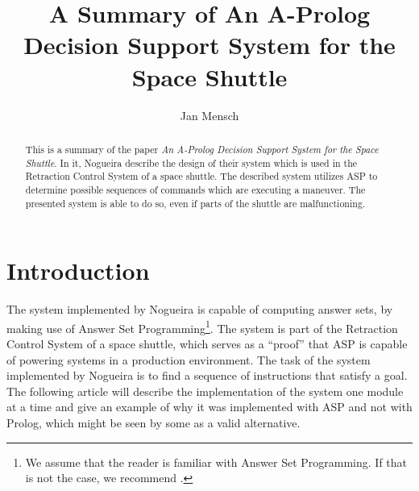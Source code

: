 \documentclass[runningheads]{llncs}
\newcommand{\papertitle}{An A-Prolog Decision Support System for the Space Shuttle}
\newcommand{\authorquote}{Nogueira \etal}
\begin{document}
\title{A Summary of \papertitle}

\author{Jan Mensch}




%
\maketitle              %
%
\begin{abstract}
This is a summary of the paper \textit{\papertitle}\cite{nogueira2001prolog}. In it, \authorquote{} describe the design of their system which is used in the Retraction Control System of a space shuttle. The described system utilizes ASP to determine possible sequences of commands which are executing a maneuver. The presented system is able to do so, even if parts of the shuttle are malfunctioning. 


\end{abstract}

\section{Introduction} \label{sec:intro}

The system implemented by \authorquote{} is capable of computing answer sets, by making use of Answer Set Programming\footnote{We assume that the reader is familiar with Answer Set Programming. If that is not the case, we recommend \cite{erdem2016applications}.}. The system is part of the Retraction Control System of a space shuttle, which serves as a ``proof'' that ASP is capable of powering systems in a production environment. The task of the system implemented by \authorquote{} is to find a sequence of instructions that satisfy a goal. The following article will describe the implementation of the system one module at a time and give an example of why it was implemented with ASP and not with Prolog, which might be seen by some as a valid alternative.
\end{document}
